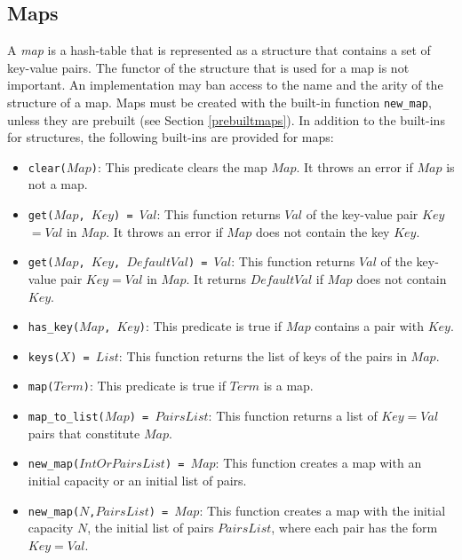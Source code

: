 \subsection{Maps}
A \emph{map} is a hash-table that is represented as a structure that contains a set of key-value pairs. The functor of the structure that is used for a map is not important.  An implementation may ban access to the name and the arity of the structure of a map. Maps must be created with the built-in function \texttt{new\_map}, unless they are prebuilt (see Section \ref{prebuiltmaps}). In addition to the built-ins for structures, the following built-ins are provided for maps:
\begin{itemize}
\item \texttt{clear($Map$)}: This predicate clears the map $Map$. It throws an error if $Map$ is not a map.
\item \texttt{get($Map$, $Key$) = $Val$}: This function returns \texttt{$Val$} of the key-value pair \texttt{$Key$$=$$Val$} in \texttt{$Map$}. It throws an error if $Map$ does not contain the key $Key$.
\item \texttt{get($Map$, $Key$, $DefaultVal$) = $Val$}: This function returns \texttt{$Val$} of the key-value pair \texttt{$Key$$=$$Val$} in \texttt{$Map$}. It returns $DefaultVal$ if $Map$ does not contain $Key$.
\item \texttt{has\_key($Map$, $Key$)}: This predicate is true if $Map$ contains a pair with $Key$. 
\item \texttt{keys($X$) = $List$}: This function returns the list of keys of the pairs in $Map$.
\item \texttt{map($Term$)}: This predicate is true if $Term$ is a map. 
\item \texttt{map\_to\_list($Map$) = $PairsList$}: This function returns a list of \texttt{$Key$$=$$Val$} pairs that constitute $Map$. 
\item \texttt{new\_map($IntOrPairsList$) = $Map$}: This function creates a map with an initial capacity or an initial list of pairs.
\item \texttt{new\_map($N$,$PairsList$) = $Map$}: This function creates a map with the initial capacity $N$, the initial list of pairs $PairsList$, where each pair has the form \texttt{$Key$$=$$Val$}.

\end{itemize}
